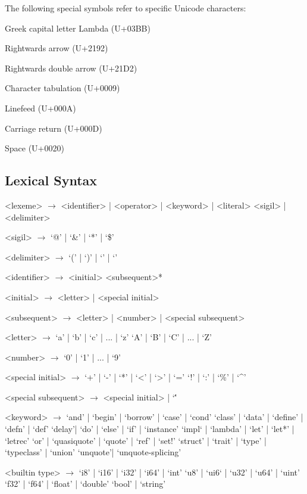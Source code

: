 The following special symbols refer to specific Unicode characters:
\begin{description}
    \item{} Greek capital letter Lambda (U+03BB)
    \item{} Rightwards arrow (U+2192)
    \item{} Rightwards double arrow (U+21D2)
    \item{} Character tabulation (U+0009)
    \item{} Linefeed (U+000A)
    \item{} Carriage return (U+000D)
    \item{} Space (U+0020)
\end{description}

\subsection{Lexical Syntax}
\setlength{\grammarindent}{6em}
    \begin{grammar}
        <lexeme> $\to$ <identifier> | <operator> | <keyword> | <literal>
                    \alt <sigil> | <delimiter>

        <sigil> $\to$ `@' | `&' | `*' | `\$'

        <delimiter> $\to$ `(' | `)' | `{' | `}'

        <identifier> $\to$ <initial> <subsequent>*

        <initial> $\to$ <letter> | <special initial>

        <subsequent> $\to$ <letter> | <number> | <special subsequent>

        <letter> $\to$ `a' | `b' | `c' | ... | `z'
                 \alt `A' | `B' | `C' | ... | `Z'

        <number> $\to$ `0' | `1' | ... | `9'

        <special initial> $\to$ `+' | `-' | `*' | `<' | `>' | `='
                          \alt `!' | `:' | `\%' | `^'

        <special subsequent> $\to$ <special initial> | `\''

        <keyword> $\to$ `and' | `begin'  | `borrow' | `case' | `cond'
                  \alt `class' | `data' | `define' | `defn' | `def'
                  \alt `delay'| `do' | `else' | `if' | `instance'
                  \alt `impl` | `lambda' | `let' | `let*' | `letrec'
                  \alt `or' | `quasiquote' | `quote' | `ref' | `set!'
                  \alt `struct' | `trait' | `type' | `typeclass' | `union'
                  \alt `unquote'| `unquote-splicing'

        <builtin type> $\to$ `i8' | `i16' | `i32' | `i64' | `int'
                        \alt `u8' | `ui6` | `u32' | `u64' | `uint'
                        \alt `f32' | `f64' | `float' | `double'
                        \alt `bool' | `string'

    \end{grammar}
